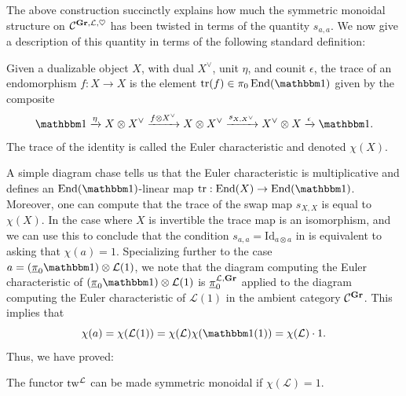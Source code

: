 The above construction succinctly explains how much the symmetric monoidal structure on $\mathcal{C}^{\operatorname{\mathbf{Gr}}, \mathcal{L}, \heartsuit}$ has been twisted in terms of the quantity $s_{a, a}$. We now give a description of this quantity in terms of the following standard definition:

\begin{dfn}
  Given a dualizable object $X$,
  with dual $X^\vee$, unit $\eta$, and counit $\epsilon$,
  the trace of an endomorphism $f: X \to X$ is the element $\mathrm{tr}(f) \in \pi_0 \End(\o)$ given by the composite
  \[ \o \xrightarrow{\eta} X \otimes X^\vee \xrightarrow{ f \otimes X^\vee} X \otimes X^\vee \xrightarrow{s_{X,X^\vee}} X^{\vee} \otimes X \xrightarrow{\epsilon} \o. \]
  The trace of the identity is called the Euler characteristic and denoted $\chi(X)$.
\end{dfn}

A simple diagram chase tells us that the Euler characteristic is multiplicative and defines an $\End(\o)$-linear map $\mathrm{tr} : \End(X) \to \End(\o)$. Moreover, one can compute that the trace of the swap map $s_{X,X}$ is equal to $\chi(X)$. In the case where $X$ is invertible the trace map is an isomorphism, and we can use this to conclude that the condition $s_{a,a} = \mathrm{Id}_{a \otimes a}$ in  is equivalent to asking that $\chi(a) = 1$. Specializing further to the case $a = (\piu_0 \o) \otimes \mathcal{L}(1)$, we note that the diagram computing the Euler characteristic of $(\piu_0 \o) \otimes \mathcal{L}(1)$ is $\underline{\pi}_0^{\mathcal{L},\operatorname{\mathbf{Gr}}}$ applied to the diagram computing the Euler characteristic of $\mathcal{L}(1)$ in the ambient category $\mathcal{C}^{\operatorname{\mathbf{Gr}}}$. This implies that
\[ \chi(a) = \chi(\mathcal{L}(1)) = \chi(\mathcal{L})\chi(\o(1)) = \chi(\mathcal{L}) \cdot 1. \]
Thus, we have proved:

\begin{lem} \label{prop:twist}
  The functor $\mathrm{tw}^{\mathcal{L}}$ can be made symmetric monoidal if $\chi(\mathcal{L}) = 1$.
\end{lem}



